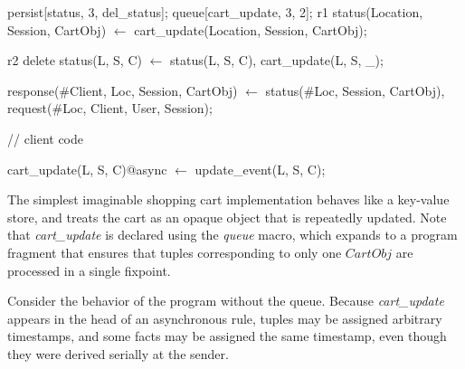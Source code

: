 \begin{Dedalus}
persist[status, 3, del_status];
queue[cart_update, 3, 2];
r1
status(Location, Session, CartObj) \(\leftarrow\)
    cart_update(Location,  Session, CartObj);
    
r2
delete status(L, S, C) \(\leftarrow\)
    status(L, S, C), cart_update(L, S, _);
  
response(#Client, Loc, Session, CartObj) \(\leftarrow\)
    status(#Loc, Session, CartObj),
    request(#Loc, Client, User, Session);

// client code

cart_update(L, S, C)@async \(\leftarrow\) 
    update_event(L, S, C);

\end{Dedalus}

The simplest imaginable shopping cart implementation behaves like a key-value store,
and treats the cart as an opaque object that is repeatedly updated.  Note that 
{\em cart\_update} is declared using the {\em queue} macro, which expands to
a program fragment that ensures that tuples corresponding to only one $CartObj$
are processed in a single fixpoint. 

Consider the behavior of the program without the queue.  Because {\em
cart\_update} appears in the head of an asynchronous rule,
 tuples may be assigned arbitrary timestamps, and some
 facts may be assigned the same timestamp, even though
they were derived serially at the sender.  



